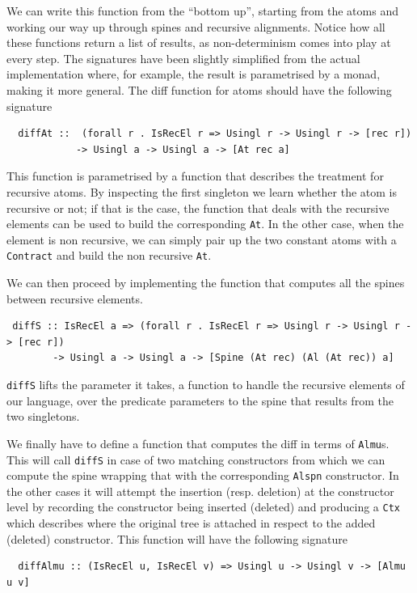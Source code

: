 \documentclass[11pt]{article}
\begin{document}
We can write this function from the ``bottom up'',
starting from the atoms and working our way up through spines and recursive alignments. 
Notice how all these functions return a list of results, as non-determinism 
comes into play at every step. The signatures have been slightly simplified from 
the actual implementation where, for example, the result is 
parametrised by a monad, making it more general.
The diff function for atoms should have the following signature
\begin{lstlisting}
  diffAt ::  (forall r . IsRecEl r => Usingl r -> Usingl r -> [rec r])
            -> Usingl a -> Usingl a -> [At rec a]
\end{lstlisting}
This function is parametrised by a function that describes the treatment for 
recursive atoms. By inspecting the first singleton we learn whether the atom is 
recursive or not; if that is the case, the function that deals with the 
recursive elements can be used to build the corresponding \texttt{At}. In the 
other case, when the element is non recursive, we can simply pair up the two 
constant atoms with a \texttt{Contract} and build the non recursive \texttt{At}.

We can then proceed by implementing the function that computes all the spines 
between recursive elements.
\begin{lstlisting}
 diffS :: IsRecEl a => (forall r . IsRecEl r => Usingl r -> Usingl r -> [rec r])
        -> Usingl a -> Usingl a -> [Spine (At rec) (Al (At rec)) a]
\end{lstlisting}
\texttt{diffS} lifts the parameter it takes, a function to handle the 
recursive elements of our language, over the predicate parameters to the spine that results 
from the two singletons.

We finally have to define a function that computes the diff in terms of 
\texttt{Almu}s. This will call \texttt{diffS} in case of two matching constructors from which we can compute
the spine wrapping that with the corresponding \texttt{Alspn} constructor. In the other cases it will 
attempt the insertion (resp. deletion) at the constructor level by recording the constructor being inserted
(deleted) and producing a \texttt{Ctx} which describes where the original tree is attached in respect to
the added (deleted) constructor.
This function will have the following signature

\begin{lstlisting}
  diffAlmu :: (IsRecEl u, IsRecEl v) => Usingl u -> Usingl v -> [Almu u v]
\end{lstlisting}
\end{document}
